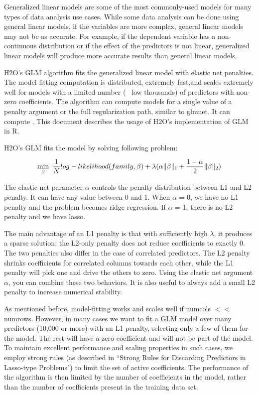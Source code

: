 \documentclass[11pt]{article}
\begin{document}
Generalized linear models are some of the most commonly-used models for many types of data analysis use cases. While some data analysis can be done using general linear models, if the variables are more complex, general linear models may not be as accurate. For example, if the dependent variable has a non-continuous distribution or if the effect of the predictors is not linear, generalized linear models will produce more accurate results than general linear models.  

H2O's GLM algorithm fits the generalized linear model with elastic net penalties. The model fitting computation is distributed, extremely fast,and scales extremely well for models with a limited number (~ low thousands) of predictors with non-zero coefficients. The algorithm can compute models for a single value of a penalty argument or the full regularization path, similar to glmnet. It can compute . This document describes the usage of H2O's implementation of GLM in R.

H2O's GLM fits the model by solving following problem:

\[ \min\limits_{\beta}\ {{1\over{N}} log-likelihood(family,\beta)  + \lambda (\alpha \| \beta \|_1}  + {1- \alpha \over 2} \| \beta \|_2) \]

The elastic net parameter $\alpha$ controls the penalty distribution between L1 and L2 penalty. It can have any value between 0 and 1. When $\alpha$ = 0, we have no L1 penalty and the problem becomes ridge regression. If $\alpha$ = 1, there is no L2 penalty and we have lasso.

The main advantage of an L1 penalty is that with sufficiently high $\lambda$, it produces a sparse solution; the L2-only penalty does not reduce coefficients to exactly 0. The two penalties also differ in the case of correlated predictors. The L2 penalty shrinks coefficients for correlated columns towards each other, while the L1 penalty will pick one and drive the others to zero. Using the elastic net argument $\alpha$, you can combine these two behaviors. It is also useful to always add a small L2 penalty to increase numerical stability.

As mentioned before, model-fitting works and scales well if numcols $<<$ numrows. However, in many cases we want to fit a GLM model over many predictors (10,000 or more) with an L1 penalty, selecting only a few of them for the model. The rest will have a zero coefficient and will not be part of the model. To maintain excellent performance and scaling properties in such cases, we employ strong rules  (as described in ``Strong Rules for Discarding Predictors in Lasso-type Problems") to limit the set of active coefficients. The performance of the algorithm is then limited by the number of coefficients in the model, rather than the number of coefficients present in the training data set. 
\end{document}
